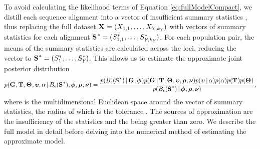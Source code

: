 \begin{linenomath}
To avoid calculating the likelihood terms of Equation \ref{eq:fullModelCompact},
we distill each sequence alignment \alignment{}{} into a vector of insufficient
summary statistics \alignmentSS{}{}, thus replacing the full dataset
$\alignmentVector = (\alignment{1}{1}, \ldots,
    \alignment{\npairs{}}{\nloci{\npairs{}}})$
with vectors of summary statistics for each alignment
$\ssVectorObs = (\alignmentSSObs{1}{1}, \ldots,
    \alignmentSSObs{\npairs{}}{\nloci{\npairs{}}})$.
For each population pair, the means of the summary statistics are calculated
across the \nloci{} loci, reducing the vector to
$\ssVectorObs = (\alignmentSSObs{1}{}, \ldots,
    \alignmentSSObs{\npairs{}}{})$.
This allows us to estimate the approximate joint posterior distribution
{\small
\begin{equation}
    p(\geneTreeVector, \divTimeMapVector, \demographicParamVector, 
    \locusMutationRateScalarVector, \locusRateHetShapeParameter \given
    \ssSpace, \hkyModelVector, \ploidyScalarVector,
    \mutationRateScalarConstantVector) =
    \frac{p(\ssSpace \given \geneTreeVector, \hkyModelVector)
        p(\geneTreeVector \given \divTimeMapVector, \demographicParamVector,
        \locusMutationRateScalarVector, \ploidyScalarVector,
        \mutationRateScalarConstantVector)
        p(\locusMutationRateScalarVector \given \locusRateHetShapeParameter)
        p(\locusRateHetShapeParameter)
        p(\divTimeMapVector)
        p(\demographicParamVector)}{
        p(\ssSpace \given \hkyModelVector, \ploidyScalarVector,
        \mutationRateScalarConstantVector)},
    \label{eq:approxModelCompact}
\end{equation}
}
where \ssSpace is the multidimensional Euclidean space around the vector of
summary statistics, the radius of which is the tolerance \tol.
The sources of approximation are the insufficiency of the statistics and the
\tol being greater than zero.
We describe the full model in detail before delving into the numerical
method of estimating the approximate model.
\end{linenomath}

